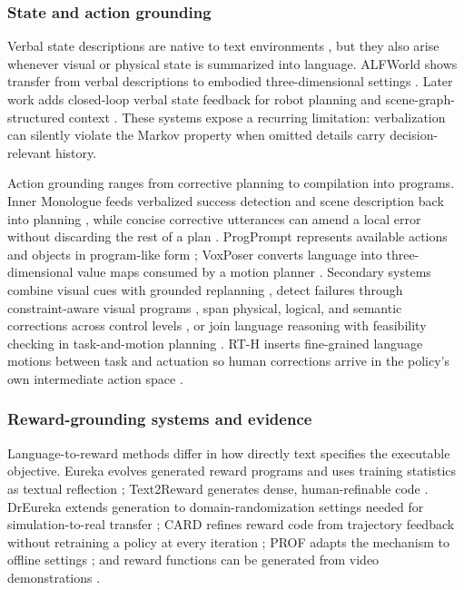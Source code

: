 \subsubsection{State and action grounding}
\label{supp:subsec:grounding-state-action}

Verbal state descriptions are native to text environments \citep{yao2020keep,cote2018textworld}, but they also arise whenever visual or physical state is summarized into language. ALFWorld shows transfer from verbal descriptions to embodied three-dimensional settings \citep{shridhar2020alfworld}. Later work adds closed-loop verbal state feedback for robot planning \citep{bhat2024grounding} and scene-graph-structured context \citep{huang2025escacontextualizingembodiedagents}. These systems expose a recurring limitation: verbalization can silently violate the Markov property when omitted details carry decision-relevant history.

Action grounding ranges from corrective planning to compilation into programs. Inner Monologue feeds verbalized success detection and scene description back into planning \citep{huang2022inner}, while concise corrective utterances can amend a local error without discarding the rest of a plan \citep{sharma2022correcting}. ProgPrompt represents available actions and objects in program-like form \citep{singh2022progprompt}; VoxPoser converts language into three-dimensional value maps consumed by a motion planner \citep{huang2023voxposer}. Secondary systems combine visual cues with grounded replanning \citep{kim2025multi}, detect failures through constraint-aware visual programs \citep{zhou2025code}, span physical, logical, and semantic corrections across control levels \citep{joublin2024copal}, or join language reasoning with feasibility checking in task-and-motion planning \citep{zhang2025llm}. RT-H inserts fine-grained language motions between task and actuation so human corrections arrive in the policy's own intermediate action space \citep{belkhale2024rth}.

\subsubsection{Reward-grounding systems and evidence}
\label{supp:subsec:grounding-reward}

Language-to-reward methods differ in how directly text specifies the executable objective. Eureka evolves generated reward programs and uses training statistics as textual reflection \citep{ma2024eureka}; Text2Reward generates dense, human-refinable code \citep{xie2024text2reward}. DrEureka extends generation to domain-randomization settings needed for simulation-to-real transfer \citep{ma2024dreureka}; CARD refines reward code from trajectory feedback without retraining a policy at every iteration \citep{sun2025large}; PROF adapts the mechanism to offline settings \citep{sun2025prof}; and reward functions can be generated from video demonstrations \citep{zeng2024video2reward}.

